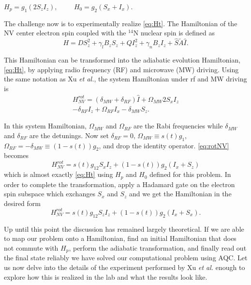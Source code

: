 \documentclass[%
 reprint,
 amsmath,amssymb,
 aps,
]{revtex4-1}
\begin{document}
\begin{center}
	$H_p = g_1\left(2S_zI_z\right), \hspace{1cm} H_0 = g_2\left(S_x + I_x\right) $.
\end{center}

	The challenge now is to experimentally realize \ref{eq:Ht}. The Hamiltonian of the NV center electron spin coupled with the $^{14}$N nuclear spin is defined as
	\begin{equation}
		H = DS_z^2 + \gamma_lB_zS_z + QI_z^2 + \gamma_nB_zI_z + \hat{S}\tilde{A}\hat{I}.
	\end{equation}

	This Hamiltonian can be transformed into the adiabatic evolution Hamiltonian, \ref{eq:Ht}, by applying radio frequency (RF) and microwave (MW) driving\cite{Kong2016}. Using the same notation as Xu \textit{et al.}, the system Hamiltonian under rf and MW driving is
	\begin{equation}
	\begin{split}
		H^{rot}_{NV} = \left( \delta_{MW} + \delta_{RF} \right)\hat{I} + \Omega_{MW}2S_xI_z \\ - \delta_{RF}I_z + \Omega_{RF}I_x - \delta_{MW}S_z.
	\end{split}
	\label{eq:rotNV}
	\end{equation}
	
	In this system Hamiltonian, $\Omega_{MW}$ and $\Omega_{RF}$ are the Rabi frequencies while $\delta_{MW}$ and $\delta_{RF}$ are the detunings. Now set $\delta_{RF}=0$, $\Omega_{MW}\equiv s(t)g_1$, $\Omega_{RF}=-\delta_{MW}\equiv \left(1-s(t)\right)g_2$, and drop the identity operator. \ref{eq:rotNV} becomes
	\begin{equation}
		H^{rot}_{NV} = s(t)g_12S_xI_z + \left(1-s(t)\right)g_2\left(I_x + S_z\right)
	\end{equation}
which is almost exactly \ref{eq:Ht} using $H_p$ and $H_0$ defined for this problem. In order to complete the transformation, apply a Hadamard gate on the electron spin subspace which exchanges $S_x$ and $S_z$ and we get the Hamiltonian in the desired form
	\begin{equation}
		H^{rot}_{NV} = s(t)g_12S_zI_z + \left(1-s(t)\right)g_2\left(I_x + S_x\right).
	\end{equation}
	
	Up until this point the discussion has remained largely theoretical. If we are able to map our problem onto a Hamiltonian, find an initial Hamiltonian that does not commute with $H_p$, perform the adiabatic transformation, and finally read out the final state reliably we have solved our computational problem using AQC. Let us now delve into the details of the experiment performed by Xu \textit{et al.} enough to explore how this is realized in the lab and what the results look like. 
\end{document}
